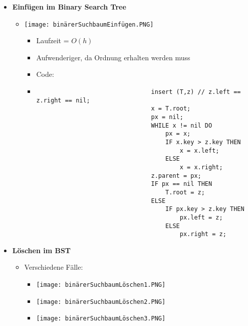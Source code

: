 \begin{itemize}
        \item \textbf{Einfügen im Binary Search Tree}
            \begin{itemize}
                \item[]
                    \begin{minipage}{0.4\textwidth}
                        \texttt{[image: binärerSuchbaumEinfügen.PNG]}
                    \end{minipage}
                    \begin{minipage}{0.5\textwidth}
                        \begin{itemize}
                            \item Laufzeit = $O(h)$
                            \item Aufwenderiger, da Ordnung erhalten werden muss
                            \item Code:
                            \item[]
                                \begin{verbatim}
                                insert (T,z) // z.left == z.right == nil;
                                x = T.root;
                                px = nil;
                                WHILE x != nil DO
                                    px = x;
                                    IF x.key > z.key THEN
                                        x = x.left;
                                    ELSE 
                                        x = x.right;
                                z.parent = px;
                                IF px == nil THEN
                                    T.root = z;
                                ELSE 
                                    IF px.key > z.key THEN
                                        px.left = z;
                                    ELSE 
                                        px.right = z;
                                \end{verbatim}
                        \end{itemize}
                    \end{minipage}
            \end{itemize}

\pagebreak

        \item \textbf{Löschen im BST}
            \begin{itemize}
                \item Verschiedene Fälle:
                    \begin{itemize}
                        \item[] \texttt{[image: binärerSuchbaumLöschen1.PNG]}
                        \item[] \texttt{[image: binärerSuchbaumLöschen2.PNG]} 
                        \item[] \texttt{[image: binärerSuchbaumLöschen3.PNG]} 
                    \end{itemize}


\end{itemize}
\end{itemize}
